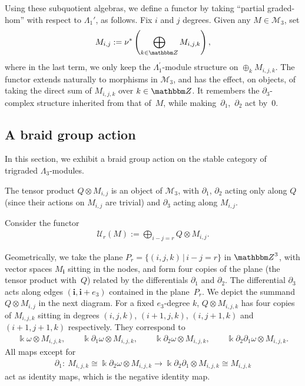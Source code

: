 \documentclass[pdftex]{sigma}
\theoremstyle{definition}
\numberwithin{equation}{section}
\def\Z{{\mathbbm Z}}
\def\dif{\partial}
\def\lra{{\longrightarrow}}
\def\mc{\mathcal}
\begin{document}
Using these subquotient algebras, we define a functor by taking ``partial graded-hom'' with respect to $\Lambda_1'$, as follows. Fix $i$ and $j$ degrees. Given any $M\in \mc{M}_3$, set
\begin{gather*}
M_{i,j}:= \nu^*\left( \bigoplus_{k\in \Z}M_{i,j,k}\right),
\end{gather*}
where in the last term, we only keep the $\Lambda_1^\prime$-module structure on $\oplus_{k} M_{i,j,k}$.
The functor extends naturally to morphisms in $\mc{M}_3$, and has the effect, on objects, of taking the direct sum of $M_{i,j,k}$ over $k\in \Z$. It remembers the $\dif_3$-complex structure inherited from that of~$M$, while making~$\partial_1$,~$\partial_2$ act by~$0$.


\subsection{A braid group action}
In this section, we exhibit a braid group action on the stable category of trigraded $\Lambda_3$-modules.

The tensor product $Q\otimes M_{i,j}$ is an object of $\mc{M}_3$, with
$\partial_1$, $\partial_2$ acting only along $Q$ (since their actions on $M_{i,j}$
are trivial) and $\partial_3$ acting along $M_{i,j}$.

Consider the functor
\begin{gather*}
\mc{U}_r(M) := \bigoplus_{i-j=r} Q\otimes M_{i,j} .
\end{gather*}

Geometrically, we take the plane $P_r=\{(i,j,k)\,|\, i-j=r\}$ in $\Z^3$,
with vector spaces $M_{\mathbf{i}}$ sitting in the nodes, and form four copies
of the plane (the tensor product with~$Q$) related by the differentials $\partial_1 $
and $\partial_2$. The differential $\partial_3$ acts along edges $(\mathbf{i},\mathbf{i}+e_3)$
contained in the plane~$P_r$. We depict the summand $Q\otimes M_{i,j}$ in the next diagram. For a fixed $e_3$-degree $k$, $Q\otimes M_{i,j,k}$ has four copies of $M_{i,j,k}$ sitting in degrees $(i,j,k)$, $(i+1,j,k)$, $(i,j+1,k)$ and $(i+1,j+1,k)$ respectively. They correspond to
\begin{gather*}
\Bbbk\omega\otimes M_{i,j,k},\qquad
\Bbbk\dif_1\omega\otimes M_{i,j,k},\qquad
\Bbbk\dif_2\omega\otimes M_{i,j,k}, \qquad
\Bbbk \dif_2\dif_1\omega \otimes M_{i,j,k}.
\end{gather*}
All maps except for{\samepage
\begin{gather*}\dif_1\colon \ M_{i,j,k}\cong \Bbbk\dif_2\omega \otimes M_{i,j,k}\lra \Bbbk \dif_2\dif_1\otimes M_{i,j,k} \cong M_{i,j,k}\end{gather*}
act as identity maps, which is the negative identity map.}
\end{document}
